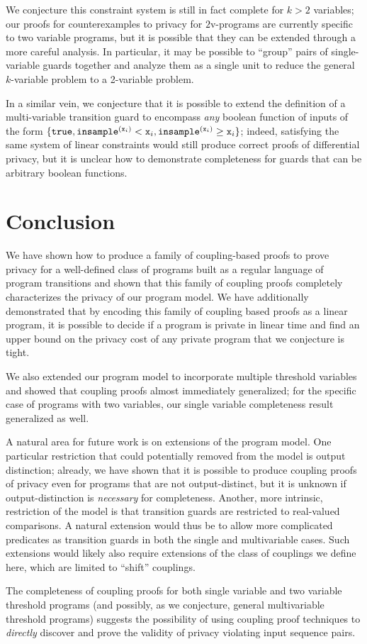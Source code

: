 We conjecture this constraint system is still in fact complete for $k>2$ variables; our proofs for counterexamples to privacy for $2$v-programs are currently specific to two variable programs, but it is possible that they can be extended through a more careful analysis. In particular, it may be possible to ``group'' pairs of single-variable guards together and analyze them as a single unit to reduce the general $k$-variable problem to a 2-variable problem. 

In a similar vein, we conjecture that it is possible to extend the definition of a multi-variable transition guard to encompass \textit{any} boolean function of inputs of the form $\{\texttt{true}, \mvlguard[\texttt{x}_i], \mvgguard[\texttt{x}_i]\}$; indeed, satisfying the same system of linear constraints would still produce correct proofs of differential privacy, but it is unclear how to demonstrate completeness for guards that can be arbitrary boolean functions. 


\section{Conclusion}
We have shown how to produce a family of coupling-based proofs to prove privacy for a well-defined class of programs built as a regular language of program transitions and shown that this family of coupling proofs completely characterizes the privacy of our program model. 
We have additionally demonstrated that by encoding this family of coupling based proofs as a linear program, it is possible to decide if a program is private in linear time and find an upper bound on the privacy cost of any private program that we conjecture is tight. 

We also extended our program model to incorporate multiple threshold variables and showed that coupling proofs almost immediately generalized; for the specific case of programs with two variables, our single variable completeness result generalized as well. 

A natural area for future work is on extensions of the program model. One particular restriction that could potentially removed from the model is output distinction; already, we have shown that it is possible to produce coupling proofs of privacy even for programs that are not output-distinct, but it is unknown if output-distinction is \textit{necessary} for completeness.
Another, more intrinsic, restriction of the model is that transition guards are restricted to real-valued comparisons. A natural extension would thus be to allow more complicated predicates as transition guards in both the single and multivariable cases. 
Such extensions would likely also require extensions of the class of couplings we define here, which are limited to ``shift'' couplings. 

The completeness of coupling proofs for both single variable and two variable threshold programs (and possibly, as we conjecture, general multivariable threshold programs) suggests the possibility of using coupling proof techniques to \textit{directly} discover and prove the validity of privacy violating input sequence pairs.